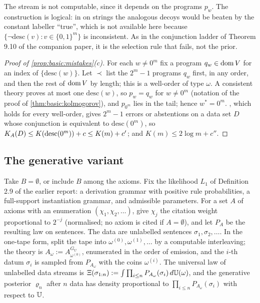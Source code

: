 The stream is not computable, since it depends on the programs $p_w$. The construction is logical: in \SOIabbr on strings the analogous decoys would be beaten by the constant labeller ``true'', which is not available here because $\{\neg\mathrm{desc}(v):v\in\{0,1\}^m\}$ is inconsistent. As in the conjunction ladder of Theorem 9.10 of the companion paper, it is the selection rule that fails, not the prior.

\begin{proof}[Proof of \cref{prop:basic:mistakes}(c)]
For each $w\ne0^m$ fix a program $q_w\in\operatorname{dom} V$ for an index of $\{\mathrm{desc}(w)\}$. Let $\prec$ list the $2^m-1$ programs $q_w$ first, in any order, and then the rest of $\operatorname{dom} V$ by length; this is a well-order of type $\omega$. A consistent theory proves at most one $\mathrm{desc}(w)$, so $p_w=q_w$ for $w\ne0^m$ (notation of the proof of \cref{thm:basic:kolmogorov}), and $p_{0^m}$ lies in the tail; hence $w^*=0^m$. , which holds for every well-order, gives $2^m-1$ errors or abstentions on a data set $D$ whose conjunction is equivalent to $\mathrm{desc}(0^m)$, so $K_{A}(D)\le K(\mathrm{desc}(0^m))+c\le K(m)+c'$; and $K(m)\le2\log m+c''$.
\end{proof}

\subsection{The generative variant}\label{app:basic:generative}

\begin{definition}\label{def:setting:generative}
Take $B=\emptyset$, or include $B$ among the axioms. Fix the likelihood $L_1$ of Definition 2.9 of the earlier report: a derivation grammar with positive rule probabilities, a full-support instantiation grammar, and admissible parameters. For a set $A$ of axioms with an enumeration $(\chi_1,\chi_2,\dots)$, give $\chi_j$ the citation weight proportional to $2^{-j}$ (normalised; no axiom is cited if $A=\emptyset$), and let $P_A$ be the resulting law on sentences. The data are unlabelled sentences $\sigma_1,\sigma_2,\dots$. In the one-tape form, split the tape into $\omega^{(0)},\omega^{(1)},\dots$ by a computable interleaving; the theory is $A_\omega:=A^{G_U}_{\omega^{(0)}}$, enumerated in the order of emission, and the $i$-th datum $\sigma_i$ is sampled from $P_{A_\omega}$ with the coins $\omega^{(i)}$. The universal law of unlabelled data streams is $\Xi(\sigma_{1:n}):=\int\prod_{i\le n}P_{A_\omega}(\sigma_i)\,d\mathbb{U}(\omega)$, and the generative posterior $\varrho_n$ after $n$ data has density proportional to $\prod_{i\le n}P_{A_\omega}(\sigma_i)$ with respect to $\mathbb{U}$.
\end{definition}

